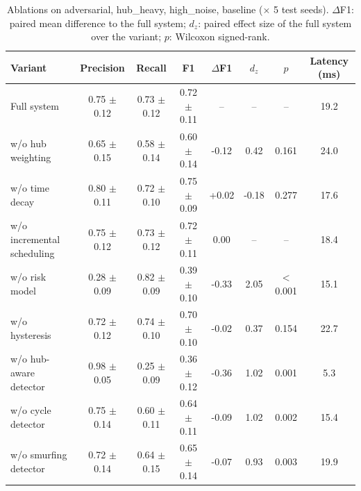 \begin{table}[t]
\centering
\caption{Ablations on adversarial, hub\_heavy, high\_noise, baseline
($\times$ 5 test seeds). $\Delta$F1: paired mean difference to the full system;
$d_z$: paired effect size of the full system over the variant; $p$: Wilcoxon signed-rank.}
\label{tab:ablation}
\begin{tabular}{lccccccc}
\toprule
Variant & Precision & Recall & F1 & $\Delta$F1 & $d_z$ & $p$ & Latency (ms) \\
\midrule
Full system & 0.75 $\pm$ 0.12 & 0.73 $\pm$ 0.12 & 0.72 $\pm$ 0.11 & -- & -- & -- & 19.2 \\
w/o hub weighting & 0.65 $\pm$ 0.15 & 0.58 $\pm$ 0.14 & 0.60 $\pm$ 0.14 & -0.12 & 0.42 & 0.161 & 24.0 \\
w/o time decay & 0.80 $\pm$ 0.11 & 0.72 $\pm$ 0.10 & 0.75 $\pm$ 0.09 & +0.02 & -0.18 & 0.277 & 17.6 \\
w/o incremental scheduling & 0.75 $\pm$ 0.12 & 0.73 $\pm$ 0.12 & 0.72 $\pm$ 0.11 & 0.00 & -- & -- & 18.4 \\
w/o risk model & 0.28 $\pm$ 0.09 & 0.82 $\pm$ 0.09 & 0.39 $\pm$ 0.10 & -0.33 & 2.05 & $<$0.001 & 15.1 \\
w/o hysteresis & 0.72 $\pm$ 0.12 & 0.74 $\pm$ 0.10 & 0.70 $\pm$ 0.10 & -0.02 & 0.37 & 0.154 & 22.7 \\
w/o hub-aware detector & 0.98 $\pm$ 0.05 & 0.25 $\pm$ 0.09 & 0.36 $\pm$ 0.12 & -0.36 & 1.02 & 0.001 & 5.3 \\
w/o cycle detector & 0.75 $\pm$ 0.14 & 0.60 $\pm$ 0.11 & 0.64 $\pm$ 0.11 & -0.09 & 1.02 & 0.002 & 15.4 \\
w/o smurfing detector & 0.72 $\pm$ 0.14 & 0.64 $\pm$ 0.15 & 0.65 $\pm$ 0.14 & -0.07 & 0.93 & 0.003 & 19.9 \\
\bottomrule
\end{tabular}
\end{table}
